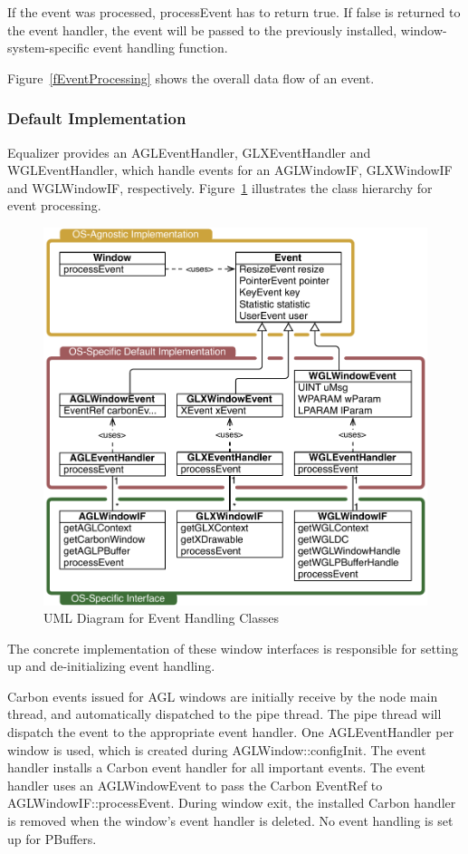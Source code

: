 \documentclass[10pt,a4]{scrartcl}
\newcommand{\fig}[1]{Figure~\ref{#1}}
\begin{document}
If the event was processed, \textsf{processEvent} has to return
\textsf{true}. If \textsf{false} is returned to the event handler, the
event will be passed to the previously installed, window-system-specific
event handling function.

\fig{fEventProcessing} shows the overall data flow of an event.

\subsubsection{Default Implementation}

Equalizer provides an \textsf{AGLEvent\-Handler},
\textsf{GLXEventHandler} and \textsf{WGL\-Event\-Handler}, which handle
events for an \textsf{AGLWindowIF}, \textsf{GLXWindowIF} and
\textsf{WGLWindowIF}, respectively. \fig{fEventUML} illustrates the
class hierarchy for event processing.

\begin{figure}
  \includegraphics[width=.618\textwidth]{images/eventUML.pdf}
  {\caption{\label{fEventUML}UML Diagram for Event Handling Classes}}
\end{figure}
The concrete implementation of these window interfaces is responsible
for setting up and de-initializing event handling.

Carbon events issued for AGL windows are initially receive by the node
main thread, and automatically dispatched to the pipe thread. The pipe
thread will dispatch the event to the appropriate event handler. One
\textsf{AGLEventHandler} per window is used, which is created during
\textsf{AGLWindow::configInit}. The event handler installs a Carbon
event handler for all important events. The event handler uses an
\textsf{AGLWindowEvent} to pass the Carbon \textsf{EventRef} to
\textsf{AGLWindowIF::processEvent}. During window exit, the installed
Carbon handler is removed when the window's event handler is deleted. No
event handling is set up for PBuffers.
\end{document}
